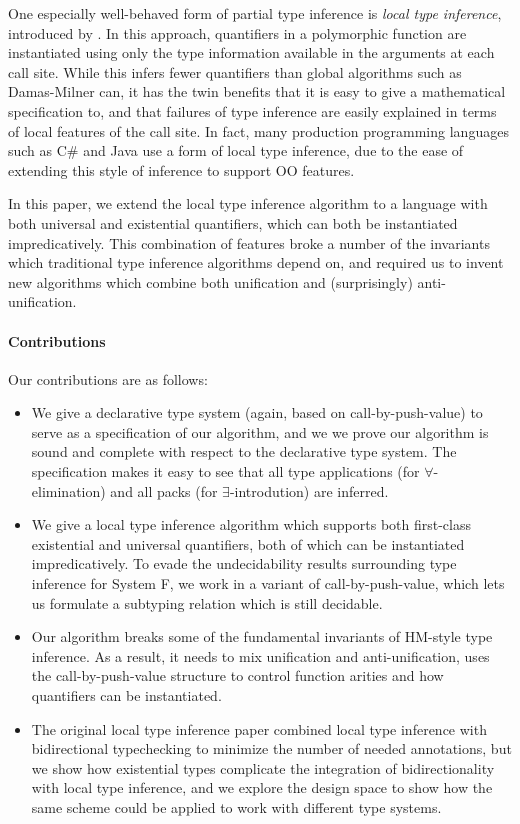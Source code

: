 One especially well-behaved form of partial type inference is \emph{local type inference}, introduced by \citet{pierce-local-2000}. In this approach, quantifiers in a polymorphic function are instantiated using only the type information available in the arguments at each call site. While this infers fewer quantifiers than global algorithms such as Damas-Milner can, it has the twin benefits that it is easy to give a mathematical specification to, and that failures of type inference are easily explained in terms of local features of the call site. In fact, many production programming languages such as C\# and Java use a form of local type inference, due to the ease of extending this style of inference to support OO features. 

In this paper, we extend the local type inference algorithm to a language with both universal and existential quantifiers, which can both be instantiated impredicatively. This combination of features broke a number of the invariants which traditional type inference algorithms depend on, and required us to invent new algorithms which combine both unification and (surprisingly) anti-unification. 


\paragraph{Contributions} Our contributions are as follows: 
\begin{itemize}
\item We give a declarative type system (again, based on call-by-push-value) to serve as a specification of our algorithm, and we we prove our algorithm is sound and complete with respect to the declarative type system. The specification makes it easy to see that all type applications (for $\forall$-elimination) and all packs (for $\exists$-introdution) are inferred. 

\item We give a local type inference algorithm which supports both first-class existential and universal quantifiers, both of which can be instantiated impredicatively. To evade the undecidability results surrounding type inference for System F, we work in a variant of call-by-push-value, which lets us formulate a subtyping relation which is still decidable. 


\item Our algorithm breaks some of the fundamental invariants of
  HM-style type inference. As a result, it needs to mix unification
  and anti-unification, uses the call-by-push-value structure to
  control function arities and how quantifiers can be instantiated. 

\item The original local type inference paper combined local type inference
  with bidirectional typechecking to minimize the number of needed
  annotations, but we show how existential types complicate the integration
  of bidirectionality with local type inference, and we explore the design space
  to show how the same scheme could be applied to work with different
  type systems. 
\end{itemize}

